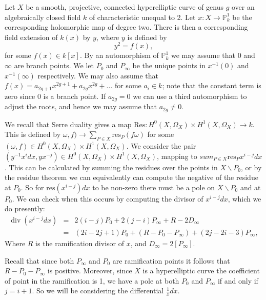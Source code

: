 \documentclass[draft, 11pt]{article} %
\title{}
\author{}
\theoremstyle{plain}
\theoremstyle{remark}
\DeclareMathOperator{\di}{div}
\begin{document}
\maketitle


Let $X$ be a smooth, projective, connected hyperelliptic curve of genus $g$ over an algebraically closed field $k$ of characteristic unequal to 2.
Let $x:X\rightarrow \mathbb P_k^1$ be the corresponding holomorphic map of degree two.
There is then a corresponding field extension of $k(x)$ by $y$, where $y$ is defined by
\[
y^2 = f(x),
\]
for some $f(x)\in k[x]$.
By an automorphism of $\mathbb P_k^1$ we may assume that $0$ and $\infty$ are branch points.
We let $P_0$ and $P_\infty$ be the unique points in $x^{-1}(0)$ and $x^{-1}(\infty)$ respectively.
We may also assume that $f(x) = a_{2g+1}x^{2g+1} + a_{2g}x^{2g} + \ldots $ for some $a_i \in k$; note that the constant term is zero since $0$ is a branch point.
If $a_{2g}=0$ we can use a third automorphism to adjust the roots, and hence we may assume that $a_{2g} \neq 0$.


We recall that Serre duality gives a map $\text{Res}: H^0(X,\Omega_X) \times H^1(X,\Omega_X) \rightarrow k$.
This is defined by  $\omega,f) \rightarrow \sum_{P\in X}\text{res}_P(f\omega)$ for some $(\omega, f) \in   H^0(X,\Omega_X) \times H^1(X,\Omega_X)$.
We consider the pair $(y^{-1}x^idx,yx^{-j})\in  H^0(X,\Omega_X) \times H^1(X,\Omega_X)$, mapping to $sum_{P\in X} \text{res}_P x^{i-j}dx$.
This can be calculated by summing the residues over the points in $X\backslash P_0$, or by the residue theorem we can equivalently can compute the negative of the residue at $P_0$.
So for $\text{res}(x^{i-j})dx$ to be non-zero there must be a pole on $X\backslash P_0$ and at $P_0$.
We can check when this occurs by computing the divisor of $x^{i-j}dx$, which we do presently:
\begin{eqnarray}
	\di(x^{i-j}dx) & = &  2(i-j)P_0 +  2(j-i)P_\infty + R - 2D_\infty \\
	& = & (2i-2j+1)P_0 +(R-P_0-P_\infty) +(2j-2i-3)P_\infty,
\end{eqnarray}
Where $R$ is the ramification divisor of $x$, and $D_\infty = 2[P_\infty]$.

Recall that since both $P_\infty$ and $P_0$ are ramification points it follows that $R-P_0-P_\infty$ is positive.
Moreover, since $X$ is a hyperelliptic curve the coefficient of point in the ramification is 1, we have a pole at both $P_0$ and $P_\infty$ if and only if $j=i+1$.
So we will be considering the differential $\frac{1}{x}dx$.
\end{document}
